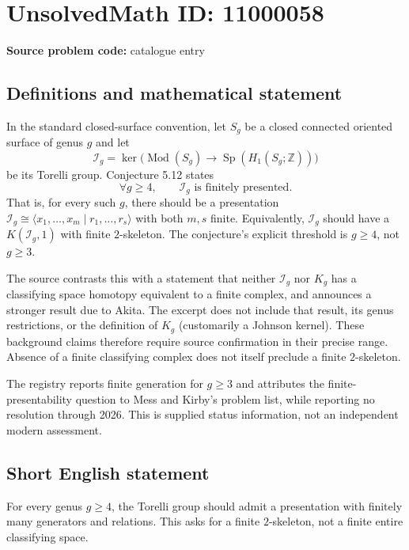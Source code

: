 \documentclass[11pt]{article}
\newcommand{\Z}{\mathbb{Z}}
\begin{document}
\section*{UnsolvedMath ID: 11000058}
\textbf{Source problem code:} catalogue entry
\subsection{Definitions and mathematical statement}
In the standard closed-surface convention, let $S_g$ be a closed connected oriented surface of genus $g$ and let
\[
 \mathcal I_g=\ker\bigl(\operatorname{Mod}(S_g)
 \to\operatorname{Sp}(H_1(S_g;\Z))\bigr)
\]
be its Torelli group. Conjecture 5.12 states
\[
 \forall g\geq4,\qquad\mathcal I_g\text{ is finitely presented}.
\]
That is, for every such $g$, there should be a presentation $\mathcal I_g\cong\langle x_1,\ldots,x_m\mid r_1,\ldots,r_s\rangle$ with both $m,s$ finite. Equivalently, $\mathcal I_g$ should have a $K(\mathcal I_g,1)$ with finite $2$-skeleton. The conjecture's explicit threshold is $g\geq4$, not $g\geq3$.

The source contrasts this with a statement that neither $\mathcal I_g$ nor $K_g$ has a classifying space homotopy equivalent to a finite complex, and announces a stronger result due to Akita. The excerpt does not include that result, its genus restrictions, or the definition of $K_g$ (customarily a Johnson kernel). These background claims therefore require source confirmation in their precise range. Absence of a finite classifying complex does not itself preclude a finite $2$-skeleton.

The registry reports finite generation for $g\geq3$ and attributes the finite-presentability question to Mess and Kirby's problem list, while reporting no resolution through 2026. This is supplied status information, not an independent modern assessment.
\subsection{Short English statement}
For every genus $g\geq4$, the Torelli group should admit a presentation with finitely many generators and relations. This asks for a finite $2$-skeleton, not a finite entire classifying space.
\end{document}

